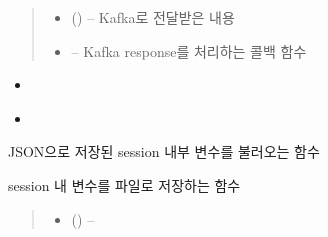 \documentclass[a4paper,10pt,english]{sphinxmanual}
\begin{document}
\begin{fulllineitems}
\begin{fulllineitems}
\begin{quote}
\begin{description}
\begin{itemize}
\item {} 
\sphinxAtStartPar
{} () – Kafka로 전달받은 내용

\item {} 
\sphinxAtStartPar
{} – Kafka response를 처리하는 콜백 함수

\end{itemize}

\end{description}\end{quote}


\nopagebreak

\begin{itemize}
\item {} 
\sphinxAtStartPar
{\hyperref[\detokenize{_Session:Session.gitPatch}]{}}

\item {} 
\sphinxAtStartPar
{\hyperref[\detokenize{_Session:Session.kafkaProducer}]{}}

\end{itemize}



\end{fulllineitems}


\begin{fulllineitems}
\label{\detokenize{_Session:Session.__read_dict}}
\pysigstartsignatures
{}
\pysigstopsignatures
\sphinxAtStartPar
JSON으로 저장된 session 내부 변수를 불러오는 함수

\end{fulllineitems}


\begin{fulllineitems}
\label{\detokenize{_Session:Session.__save_dict}}
\pysigstartsignatures
{}
\pysigstopsignatures
\sphinxAtStartPar
session 내 변수를 파일로 저장하는 함수
\begin{quote}\begin{description}
\begin{itemize}
\item {} 
\sphinxAtStartPar
{} () – 


\end{itemize}
\end{description}
\end{quote}
\end{fulllineitems}
\end{fulllineitems}
\end{document}
